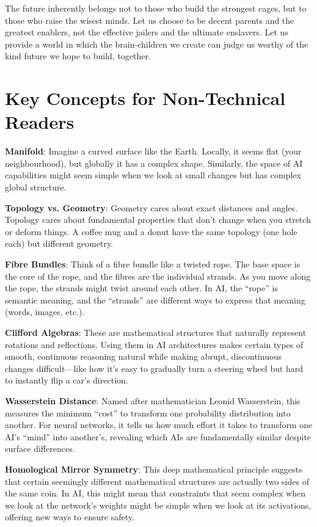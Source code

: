 \documentclass[acmsmall,screen]{acmart}
\begin{document}
The future inherently belongs not to those who build the strongest cages, but to those who raise the wisest minds.
Let us choose to be decent parents and the greatest enablers, not the effective jailers and the ultimate enslavers.
Let us provide a world in which the brain-children we create can judge us worthy of the kind future we hope to build, together.

\appendix

\section{Key Concepts for Non-Technical Readers}\label{sec:key-concepts-for-non-technical-readers}

\textbf{Manifold}: Imagine a curved surface like the Earth.
Locally, it seems flat (your neighbourhood), but globally it has a complex shape.
Similarly, the space of AI capabilities might seem simple when we look at small changes but has complex global structure.

\textbf{Topology vs. Geometry}: Geometry cares about exact distances and angles.
Topology cares about fundamental properties that don't change when you stretch or deform things.
A coffee mug and a donut have the same topology (one hole each) but different geometry.

\textbf{Fibre Bundles}: Think of a fibre bundle like a twisted rope.
The base space is the core of the rope, and the fibres are the individual strands.
As you move along the rope, the strands might twist around each other.
In AI, the ``rope'' is semantic meaning, and the ``strands'' are different ways to express that meaning (words, images, etc.).

\textbf{Clifford Algebras}: These are mathematical structures that naturally represent rotations and reflections.
Using them in AI architectures makes certain types of smooth, continuous reasoning natural while making abrupt, discontinuous changes difficult---like how it's easy to gradually turn a steering wheel but hard to instantly flip a car's direction.

\textbf{Wasserstein Distance}: Named after mathematician Leonid Wasserstein, this measures the minimum ``cost'' to transform one probability distribution into another.
For neural networks, it tells us how much effort it takes to transform one AI's ``mind'' into another's, revealing which AIs are fundamentally similar despite surface differences.

\textbf{Homological Mirror Symmetry}: This deep mathematical principle suggests that certain seemingly different mathematical structures are actually two sides of the same coin.
In AI, this might mean that constraints that seem complex when we look at the network's weights might be simple when we look at its activations, offering new ways to ensure safety.
\end{document}
